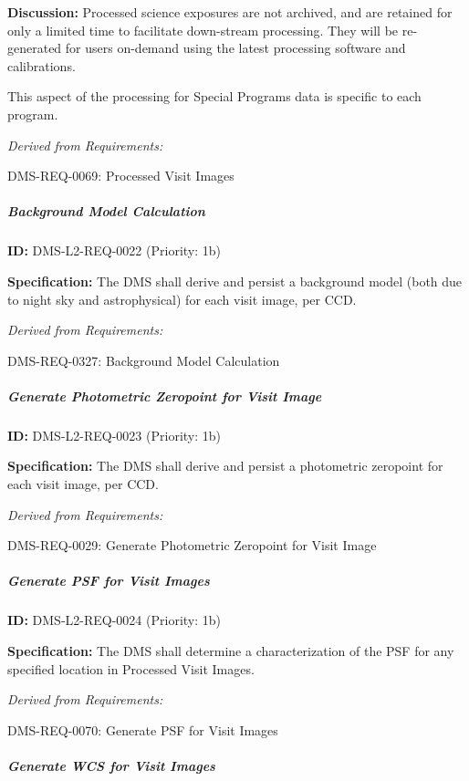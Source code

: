 \documentclass[SE,toc,lsstdraft]{lsstdoc}
\begin{document}
\textbf{Discussion:} Processed science exposures are not archived, and are retained for only a limited time to facilitate down-stream processing. They will be re-generated for users on-demand using the latest processing software and calibrations.

This aspect of the processing for Special Programs data is specific to each program.

\emph{Derived from Requirements:}

DMS-REQ-0069:
Processed Visit Images \newline

\subparagraph{Background Model Calculation}\hfill  %

\label{DMS-L2-REQ-0022}
\textbf{ID:} DMS-L2-REQ-0022 (Priority: 1b)

\textbf{Specification: }The DMS shall derive and persist a background model (both due to night sky and astrophysical) for each visit image, per CCD.

\emph{Derived from Requirements:}

DMS-REQ-0327:
Background Model Calculation \newline

\subparagraph{Generate Photometric Zeropoint for Visit Image}\hfill  %

\label{DMS-L2-REQ-0023}
\textbf{ID:} DMS-L2-REQ-0023 (Priority: 1b)

\textbf{Specification:} The DMS shall derive and persist a photometric zeropoint for each visit image, per CCD.

\emph{Derived from Requirements:}

DMS-REQ-0029:
Generate Photometric Zeropoint for Visit Image \newline

\subparagraph{Generate PSF for Visit Images}\hfill  %

\label{DMS-L2-REQ-0024}
\textbf{ID:} DMS-L2-REQ-0024 (Priority: 1b)

\textbf{Specification:} The DMS shall determine a characterization of the PSF for any specified location in Processed Visit Images.

\emph{Derived from Requirements:}

DMS-REQ-0070:
Generate PSF for Visit Images \newline

\subparagraph{Generate WCS for Visit Images}\hfill  %
\end{document}

